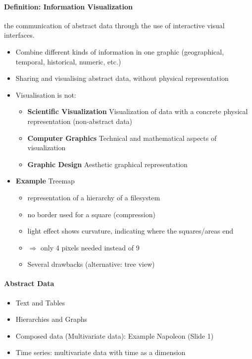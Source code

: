 \documentclass[10pt,a4paper]{article}
\begin{document}
	\paragraph*{Definition: Information Visualization}
	the communication of abstract data through the use of interactive visual interfaces.
	\begin{itemize}
		\item Combine different kinds of information in one graphic (geographical, temporal, historical, numeric, etc.)
		\item Sharing and visualising abstract data, without physical representation 
		\item Visualisation is not:
		\begin{itemize}
			\item \textbf{Scientific Visualization} Visualization of data with a concrete physical representation (non-abstract data)
			\item \textbf{Computer Graphics} Technical and mathematical aspects of visualization
			\item \textbf{Graphic Design} Aesthetic graphical representation
		\end{itemize}
		\item \textbf{Example} Treemap
		\begin{itemize}
			\item representation of a hierarchy of a filesystem
			\item no border used for a square (compression)
			\item light effect shows curvature, indicating where the squares/areas end 
			\item $ \Rightarrow $ only 4 pixels needed instead of 9
			\item Several drawbacks (alternative: tree view)
		\end{itemize}
	\end{itemize}
	\paragraph{Abstract Data}
	\begin{itemize}
		\item Text and Tables
		\item Hierarchies and Graphs
		\item Composed data (Multivariate data): Example Napoleon (Slide 1)
		\item Time series: multivariate data with time as a dimension
	\end{itemize}
\end{document}
